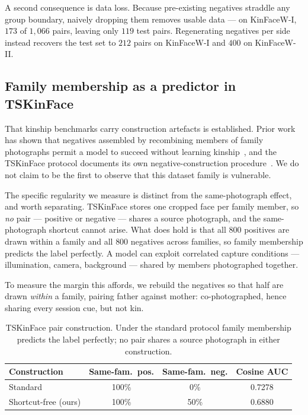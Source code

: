 \documentclass[journal,12pt]{IEEEtran}
\begin{document}
A second consequence is data loss. Because pre-existing negatives straddle any
group boundary, naively dropping them removes usable data --- on KinFaceW-I,
$173$ of $1{,}066$ pairs, leaving only $119$ test pairs. Regenerating negatives
per side instead recovers the test set to $212$ pairs on KinFaceW-I and $400$ on
KinFaceW-II.

\subsection{Family membership as a predictor in TSKinFace}

That kinship benchmarks carry construction artefacts is established. Prior work
has shown that negatives assembled by recombining members of family photographs
permit a model to succeed without learning
kinship~\cite{TODO_samephoto}, and the TSKinFace protocol documents its own
negative-construction procedure~\cite{qin2015tri}. We do not claim to be the
first to observe that this dataset family is vulnerable.

The specific regularity we measure is distinct from the same-photograph effect,
and worth separating. TSKinFace stores one cropped face per family member, so
\emph{no} pair --- positive or negative --- shares a source photograph, and the
same-photograph shortcut cannot arise. What does hold is that all $800$
positives are drawn within a family and all $800$ negatives across families, so
family membership predicts the label perfectly. A model can exploit correlated
capture conditions --- illumination, camera, background --- shared by members
photographed together.

To measure the margin this affords, we rebuild the negatives so that half are
drawn \emph{within} a family, pairing father against mother: co-photographed,
hence sharing every session cue, but not kin.

\begin{table}[t]
\caption{TSKinFace pair construction. Under the standard protocol family
membership predicts the label perfectly; no pair shares a source photograph in
either construction.}
\label{tab:ts}
\centering
\small
\begin{tabular}{@{}lccc@{}}
\toprule
Construction & Same-fam.\ pos. & Same-fam.\ neg. & Cosine AUC \\
\midrule
Standard & 100\% & 0\% & 0.7278 \\
Shortcut-free (ours) & 100\% & 50\% & 0.6880 \\
\bottomrule
\end{tabular}
\end{table}
\end{document}
